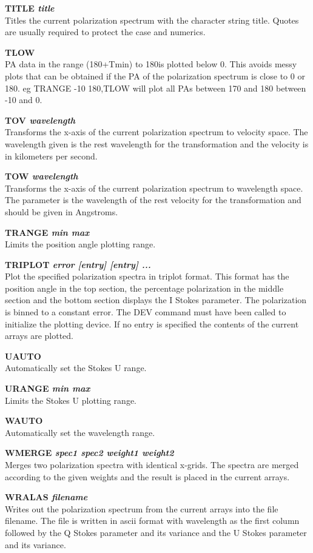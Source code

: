 {\bf TITLE \it title } \\
Titles the current polarization spectrum with the character string  title.
Quotes are usually required to protect the case and numerics.

{\bf TLOW} \\
PA data in the range (180+Tmin) to 180is plotted below 0. This avoids messy
plots that can be obtained if the PA of the polarization spectrum is close to 0
or 180. eg TRANGE -10 180,TLOW will plot all PAs between 170 and 180 between
-10 and 0.

{\bf TOV \it wavelength } \\
Transforms the x-axis of the current polarization spectrum to velocity
space. The wavelength given is the rest wavelength for the transformation and
the velocity is in kilometers per second.

{\bf TOW \it wavelength } \\
Transforms the x-axis of the current polarization spectrum to wavelength
space. The parameter is the wavelength of the rest velocity for the
transformation and should be given in Angstroms.

{\bf TRANGE \it min max } \\
Limits the position angle plotting range.

{\bf TRIPLOT \it error [entry] [entry] ...} \\
Plot the specified polarization spectra in triplot format. This format has the
position angle in the top section, the percentage polarization in the middle
section and the bottom section displays the I Stokes parameter. The
polarization is binned to a constant error. The  DEV command must have been
called to initialize the plotting device. If no  entry is specified the
contents of the current arrays are plotted.

{\bf UAUTO} \\
Automatically set the Stokes U range.

{\bf URANGE  \it min max } \\
Limits the Stokes U  plotting range.

{\bf WAUTO} \\
Automatically set the wavelength range.

{\bf WMERGE \it spec1 spec2 weight1 weight2} \\
Merges two polarization spectra with identical x-grids. The spectra
are merged according to the given weights and the result is placed in
the current arrays.

{\bf WRALAS \it filename} \\
Writes out the polarization spectrum from the current arrays into the
file filename. The file is written in ascii format with wavelength as
the first column followed by the Q Stokes parameter and its variance
and the U Stokes parameter and its variance.

